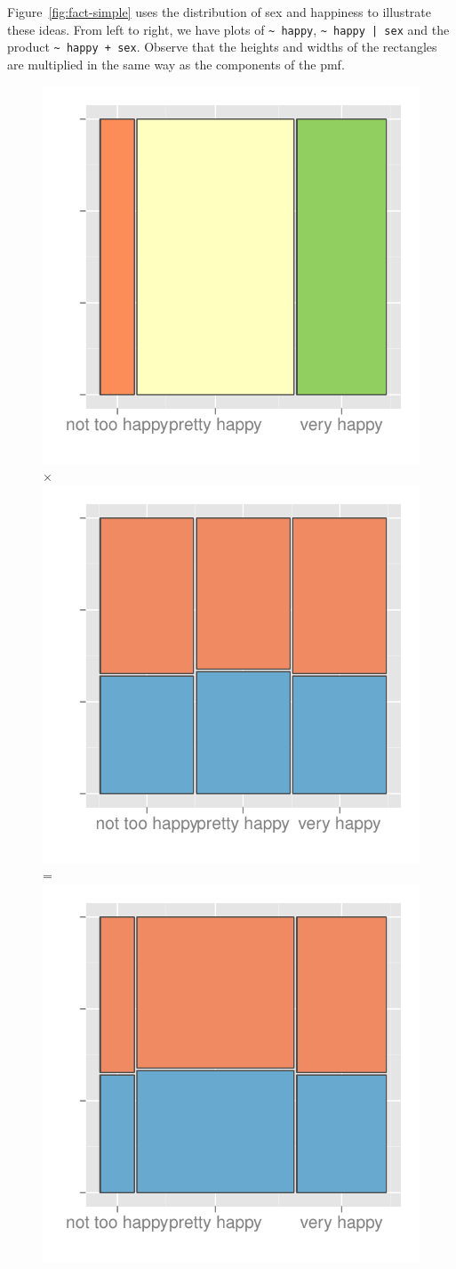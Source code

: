 \documentclass[letterpaper,oneside]{scrartcl}
\begin{document}
Figure~\ref{fig:fact-simple} uses the distribution of sex and happiness to illustrate these ideas. From left to right, we have plots of \verb|~ happy|, \verb!~ happy | sex! and the product \verb|~ happy + sex|. Observe that the heights and widths of the rectangles are multiplied in the same way as the components of the pmf.

\begin{figure}[htbp]
  \centering
  \includegraphics[width=0.3\linewidth]{fact-happy} $\times$ %
  \includegraphics[width=0.3\linewidth]{fact-happy|sex} = %
  \includegraphics[width=0.3\linewidth]{fact-happy-sex}


\end{figure}
\end{document}
